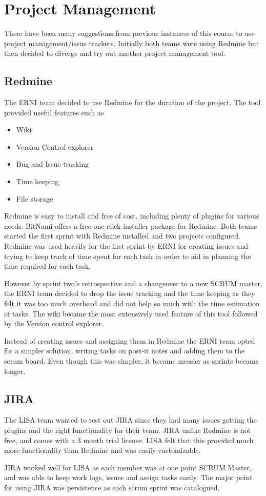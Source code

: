 \section{Project Management}

There have been many suggestions from previous instances of this course to use project management/issue trackers. Initially both teams were using Redmine but then decided to diverge and try out another project management tool. 

\subsection{Redmine}

The ERNI team decided to use Redmine for the duration of the project. The tool provided useful features such as
\begin{itemize}
\item Wiki
\item Version Control explorer
\item Bug and Issue tracking
\item Time keeping
\item File storage
\end{itemize} 

Redmine is easy to install and free of cost, including plenty of plugins for various needs. BitNami offers a free one-click-installer package for Redmine. Both teams started the first sprint with Redmine installed and two projects configured. Redmine was used heavily for the first sprint by ERNI for creating issues and trying to keep track of time spent for each task in order to aid in planning the time required for each task. 

However by sprint two's retrospective and a changeover to a new SCRUM master, the ERNI team decided to drop the issue tracking and the time keeping as they felt it was too much overhead and did not help so much with the time estimation of tasks. The wiki became the most extensively used feature of this tool followed by the Version control explorer. 

Instead of creating issues and assigning them in Redmine the ERNI team opted for a simpler solution, writing tasks on post-it notes and adding them to the scrum board. Even though this was simpler, it became messier as sprints became longer.

\subsection{JIRA}

The LISA team wanted to test out JIRA since they had many issues getting the plugins and the right functionality for their team. JIRA unlike Redmine is not free, and comes with a 3 month trial license. LISA felt that this provided much more functionality than Redmine and was easily customizable.

JIRA worked well for LISA as each member was at one point SCRUM Master, and was able to keep work logs, issues and assign tasks easily. The major point for using JIRA was persistence as each scrum sprint was catalogued.

